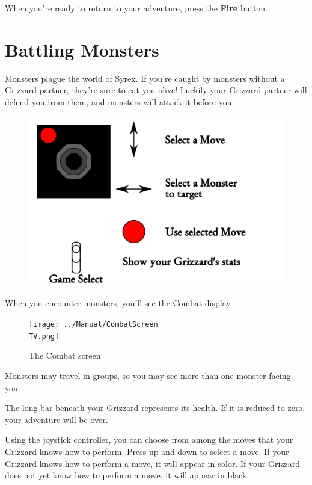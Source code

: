 \documentclass[10pt,twocolumn,openany,article]{memoir}
\newcommand\TV{NTSC}
\newcommand\TV{PAL}
\newcommand\TV{SECAM}
\begin{document}
When you're ready to return to your adventure, press the \textbf{Fire} button.


\section{Battling Monsters}

Monsters plague the world of Syrex. If you're caught by monsters without
a Grizzard partner, they're sure to eat you alive! Luckily your Grizzard
partner  will  defend  you  from  them,  and  monsters  will  attack  it
before you.

\begin{figure}[ht]
  \includegraphics[width=2\columnwidth]{../Manual/CombatControls.png}
\end{figure}

When you encounter monsters, you'll  see the Combat display.

\begin{figure}[b]
  \texttt{[image: ../Manual/CombatScreen\\TV.png]}
  \caption{The Combat screen}
\end{figure}

Monsters may  travel in  groups, so  you may see  more than  one monster
facing you.

The  long bar  beneath your  Grizzard represents  its health.  If it  is
reduced to zero, your adventure will be over.

Using the joystick controller, you can  choose from among the moves that
your Grizzard knows how to perform. Press  up and down to select a move.
If your Grizzard knows  how to perform a move, it  will appear in color.
If your Grizzard does not yet know how to perform a move, it will appear
in black.
\end{document}
